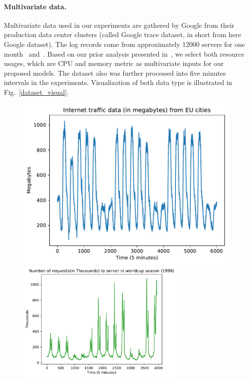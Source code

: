 \documentclass[11pt,twoside]{article}
\begin{document}
\begin{multicols}{2}
\paragraph{\textbf{Multivariate data.}} Multivariate data used in our experiments are gathered by Google from their production data center clusters (called Google trace dataset, in short from here Google dataset). The log records come from approximately 12000 servers for one month~\citep{ref_google_trace} and~\citep{reiss2011google}. Based on our prior analysis presented in~\citep{ref_thieu}, we select both resource usages, which are CPU and memory metric as multivariate inputs for our proposed models. The dataset also was further processed into five minutes intervals in the experiments. Visualization of both data type is illustrated in Fig.~\ref{dataset_visual}.

\begin{figure}[!ht] 
  \begin{minipage}[b]{0.48\linewidth}
    \centering
    \includegraphics[width=0.9\linewidth]{images/pdf/data/internet_traffic_eu_5m.pdf} 
  \end{minipage}
  \begin{minipage}[b]{0.48\linewidth}
    \centering
    \includegraphics[width=0.9\linewidth, height=6cm]{images/pdf/data/worldcup98_5m.pdf} 
  \end{minipage} 
  

\end{figure}
\end{multicols}
\end{document}
